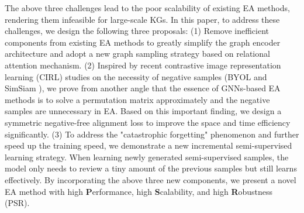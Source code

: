 \documentclass[sigconf]{acmart}
\begin{document}
The above three challenges lead to the poor scalability of existing EA methods, rendering them infeasible for large-scale KGs.
In this paper, to address these challenges, we design the following three proposals:
(1) Remove inefficient components from existing EA methods to greatly simplify the graph encoder architecture and adopt a new graph sampling strategy based on relational attention mechanism.
(2) Inspired by recent contrastive image representation learning (CIRL) studies on the necessity of negative samples (BYOL \cite{DBLP:conf/nips/GrillSATRBDPGAP20} and SimSiam \cite{DBLP:journals/corr/abs-2011-10566}), we prove from another angle that the essence of GNNs-based EA methods is to solve a permutation matrix approximately and the negative samples are unnecessary in EA.
Based on this important finding, we design a symmetric negative-free alignment loss to improve the space and time efficiency significantly.
(3) To address the "catastrophic forgetting" phenomenon and further speed up the training speed, we demonstrate a new incremental semi-supervised learning strategy.
When learning newly generated semi-supervised samples, the model only needs to review a tiny amount of the previous samples but still learns effectively.
By incorporating the above three new components, we present a novel EA method with high \textbf{P}erformance, high \textbf{S}calability, and high \textbf{R}obustness (PSR).
\end{document}
